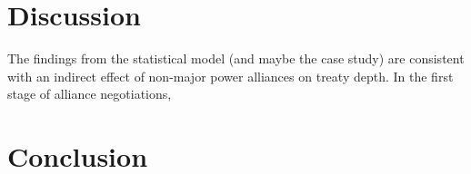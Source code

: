 \documentclass[12pt]{article}
\begin{document}
\section{Discussion}


The findings from the statistical model (and maybe the case study) are consistent with an indirect effect of non-major power alliances on treaty depth. 
In the first stage of alliance negotiations, 



\section{Conclusion}




\singlespace
 
 
\end{document}
